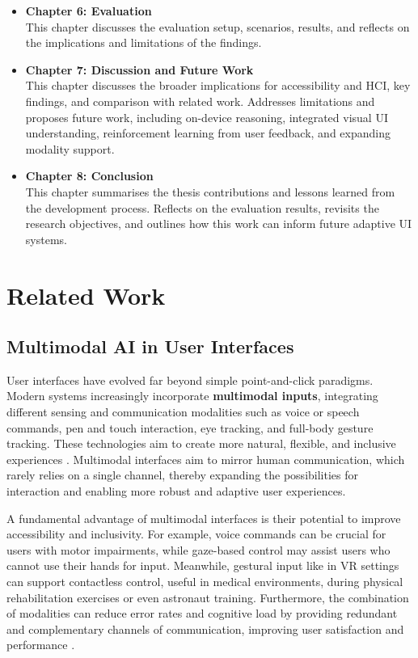 \documentclass[openany]{book}
\begin{document}
\begin{itemize}
    \item \textbf{Chapter 6: Evaluation} \\
    This chapter discusses the evaluation setup, scenarios, results, and reflects on the implications and limitations of the findings.
    \item \textbf{Chapter 7: Discussion and Future Work} \\
    This chapter discusses the broader implications for accessibility and HCI, key findings, and comparison with related work. Addresses limitations and proposes future work, including on-device reasoning, integrated visual UI understanding, reinforcement learning from user feedback, and expanding modality support.
    \item \textbf{Chapter 8: Conclusion} \\
    This chapter summarises the thesis contributions and lessons learned from the development process. Reflects on the evaluation results, revisits the research objectives, and outlines how this work can inform future adaptive UI systems.
\end{itemize}

\chapter{Related Work}
\section{Multimodal AI in User Interfaces}

User interfaces have evolved far beyond simple point-and-click paradigms. Modern systems increasingly incorporate \textbf{multimodal inputs}, integrating different sensing and communication modalities such as voice or speech commands, pen and touch interaction, eye tracking, and full-body gesture tracking. These technologies aim to create more natural, flexible, and inclusive experiences \cite{Oviatt1999}. Multimodal interfaces aim to mirror human communication, which rarely relies on a single channel, thereby expanding the possibilities for interaction and enabling more robust and adaptive user experiences. 

A fundamental advantage of multimodal interfaces is their potential to improve accessibility and inclusivity. For example, voice commands can be crucial for users with motor impairments, while gaze-based control may assist users who cannot use their hands for input. Meanwhile, gestural input like in VR settings can support contactless control, useful in medical environments, during physical rehabilitation exercises or even astronaut training. Furthermore, the combination of modalities can reduce error rates and cognitive load by providing redundant and complementary channels of communication, improving user satisfaction and performance \cite{Oviatt1999}.
\end{document}
